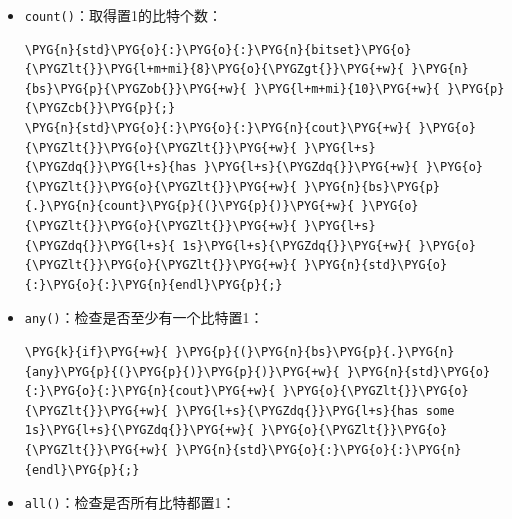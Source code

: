 \begin{itemize}
\item \texttt{count()}：取得置1的比特个数：



\begin{codeblockbg}
\begin{Verbatim}[commandchars=\\\{\},breaklines=true,breakanywhere=true,fontsize=\codefont,xleftmargin=17bp]
\PYG{n}{std}\PYG{o}{:}\PYG{o}{:}\PYG{n}{bitset}\PYG{o}{\PYGZlt{}}\PYG{l+m+mi}{8}\PYG{o}{\PYGZgt{}}\PYG{+w}{ }\PYG{n}{bs}\PYG{p}{\PYGZob{}}\PYG{+w}{ }\PYG{l+m+mi}{10}\PYG{+w}{ }\PYG{p}{\PYGZcb{}}\PYG{p}{;}
\PYG{n}{std}\PYG{o}{:}\PYG{o}{:}\PYG{n}{cout}\PYG{+w}{ }\PYG{o}{\PYGZlt{}}\PYG{o}{\PYGZlt{}}\PYG{+w}{ }\PYG{l+s}{\PYGZdq{}}\PYG{l+s}{has }\PYG{l+s}{\PYGZdq{}}\PYG{+w}{ }\PYG{o}{\PYGZlt{}}\PYG{o}{\PYGZlt{}}\PYG{+w}{ }\PYG{n}{bs}\PYG{p}{.}\PYG{n}{count}\PYG{p}{(}\PYG{p}{)}\PYG{+w}{ }\PYG{o}{\PYGZlt{}}\PYG{o}{\PYGZlt{}}\PYG{+w}{ }\PYG{l+s}{\PYGZdq{}}\PYG{l+s}{ 1s}\PYG{l+s}{\PYGZdq{}}\PYG{+w}{ }\PYG{o}{\PYGZlt{}}\PYG{o}{\PYGZlt{}}\PYG{+w}{ }\PYG{n}{std}\PYG{o}{:}\PYG{o}{:}\PYG{n}{endl}\PYG{p}{;}
\end{Verbatim}
\end{codeblockbg}



\item \texttt{any()}：检查是否至少有一个比特置1：



\begin{codeblockbg}
\begin{Verbatim}[commandchars=\\\{\},breaklines=true,breakanywhere=true,fontsize=\codefont,xleftmargin=17bp]
\PYG{k}{if}\PYG{+w}{ }\PYG{p}{(}\PYG{n}{bs}\PYG{p}{.}\PYG{n}{any}\PYG{p}{(}\PYG{p}{)}\PYG{p}{)}\PYG{+w}{ }\PYG{n}{std}\PYG{o}{:}\PYG{o}{:}\PYG{n}{cout}\PYG{+w}{ }\PYG{o}{\PYGZlt{}}\PYG{o}{\PYGZlt{}}\PYG{+w}{ }\PYG{l+s}{\PYGZdq{}}\PYG{l+s}{has some 1s}\PYG{l+s}{\PYGZdq{}}\PYG{+w}{ }\PYG{o}{\PYGZlt{}}\PYG{o}{\PYGZlt{}}\PYG{+w}{ }\PYG{n}{std}\PYG{o}{:}\PYG{o}{:}\PYG{n}{endl}\PYG{p}{;}
\end{Verbatim}
\end{codeblockbg}



\item \texttt{all()}：检查是否所有比特都置1：




\end{itemize}
